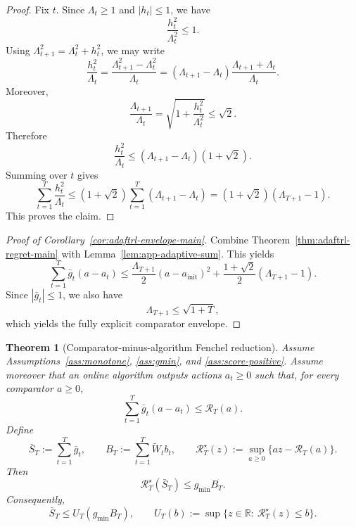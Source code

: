 \documentclass[11pt]{article}
\newtheorem{theorem}{Theorem}
\newcommand{\R}{\mathbb{R}}
\newcommand{\1}{\mathbf{1}}
\begin{document}
\begin{proof}
Fix \(t\). Since \(\Lambda_t\ge 1\) and \(|h_t|\le 1\), we have
\[
\frac{h_t^2}{\Lambda_t^2}\le 1.
\]
Using \(\Lambda_{t+1}^2=\Lambda_t^2+h_t^2\), we may write
\[
\frac{h_t^2}{\Lambda_t}
=
\frac{\Lambda_{t+1}^2-\Lambda_t^2}{\Lambda_t}
=
(\Lambda_{t+1}-\Lambda_t)\frac{\Lambda_{t+1}+\Lambda_t}{\Lambda_t}.
\]
Moreover,
\[
\frac{\Lambda_{t+1}}{\Lambda_t}
=
\sqrt{1+\frac{h_t^2}{\Lambda_t^2}}
\le \sqrt{2}.
\]
Therefore
\[
\frac{h_t^2}{\Lambda_t}
\le
(\Lambda_{t+1}-\Lambda_t)(1+\sqrt{2}).
\]
Summing over \(t\) gives
\[
\sum_{t=1}^T \frac{h_t^2}{\Lambda_t}
\le
(1+\sqrt{2})\sum_{t=1}^T (\Lambda_{t+1}-\Lambda_t)
=
(1+\sqrt{2})(\Lambda_{T+1}-1).
\]
This proves the claim.
\end{proof}

\begin{proof}[Proof of Corollary~\ref{cor:adaftrl-envelope-main}]
Combine Theorem~\ref{thm:adaftrl-regret-main} with Lemma~\ref{lem:app-adaptive-sum}. This yields
\[
\sum_{t=1}^T \bar g_t(a-a_t)
\le
\frac{\Lambda_{T+1}}{2}(a-a_{\mathrm{init}})^2
+
\frac{1+\sqrt{2}}{2}(\Lambda_{T+1}-1).
\]
Since \(|\bar g_t|\le 1\), we also have
\[
\Lambda_{T+1} \le \sqrt{1+T},
\]
which yields the fully explicit comparator envelope.
\end{proof}

\begin{theorem}[Comparator-minus-algorithm Fenchel reduction]
\label{thm:app-blackbox-variant}
Assume Assumptions~\ref{ass:monotone}, \ref{ass:gmin}, and \ref{ass:score-positive}. Assume moreover that an online algorithm outputs actions \(a_t\ge 0\) such that, for every comparator \(a\ge 0\),
\[
\sum_{t=1}^T \bar g_t(a-a_t)\le \mathcal R_T(a).
\]
Define
\[
\bar S_T:=\sum_{t=1}^T \bar g_t,
\qquad
B_T:=\sum_{t=1}^T \widetilde W_t b_t,
\qquad
\mathcal R_T^\star(z):=\sup_{a\ge 0}\{az-\mathcal R_T(a)\}.
\]
Then
\[
\mathcal R_T^\star(\bar S_T)\le g_{\min}B_T.
\]
Consequently,
\[
\bar S_T\le U_T(g_{\min}B_T),
\qquad
U_T(b):=\sup\{z\in\R:\ \mathcal R_T^\star(z)\le b\}.
\]
\end{theorem}
\end{document}

